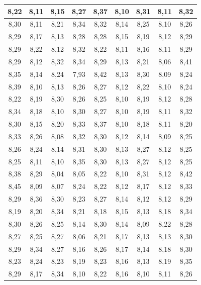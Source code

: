 \documentclass[a4paper,12pt]{article} %
\begin{document}
\begin{table}[]
	\begin{tabular}{|c|c|c|c|c|c|c|c|c|}
		\hline
		8,22 & 8,11 & 8,15 & 8,27 & 8,37 & 8,10 & 8,31 & 8,11 & 8,32 \\ \hline
		8,30 & 8,11 & 8,21 & 8,34 & 8,32 & 8,14 & 8,25 & 8,10 & 8,26 \\ \hline
		8,29 & 8,17 & 8,13 & 8,28 & 8,28 & 8,15 & 8,19 & 8,12 & 8,29 \\ \hline
		8,29 & 8,22 & 8,12 & 8,32 & 8,22 & 8,11 & 8,16 & 8,11 & 8,29 \\ \hline
		8,29 & 8,12 & 8,32 & 8,34 & 8,29 & 8,13 & 8,21 & 8,06 & 8,41 \\ \hline
		8,35 & 8,14 & 8,24 & 7,93 & 8,42 & 8,13 & 8,30 & 8,09 & 8,24 \\ \hline
		8,39 & 8,10 & 8,13 & 8,26 & 8,27 & 8,12 & 8,22 & 8,10 & 8,24 \\ \hline
		8,22 & 8,19 & 8,30 & 8,26 & 8,25 & 8,10 & 8,19 & 8,12 & 8,28 \\ \hline
		8,34 & 8,18 & 8,10 & 8,30 & 8,27 & 8,10 & 8,19 & 8,11 & 8,32 \\ \hline
		8,30 & 8,15 & 8,20 & 8,33 & 8,37 & 8,10 & 8,18 & 8,11 & 8,20 \\ \hline
		8,33 & 8,26 & 8,08 & 8,32 & 8,30 & 8,12 & 8,14 & 8,09 & 8,25 \\ \hline
		8,26 & 8,24 & 8,14 & 8,31 & 8,30 & 8,13 & 8,27 & 8,12 & 8,25 \\ \hline
		8,25 & 8,11 & 8,10 & 8,35 & 8,30 & 8,13 & 8,27 & 8,12 & 8,25 \\ \hline
		8,38 & 8,29 & 8,04 & 8,05 & 8,22 & 8,10 & 8,31 & 8,12 & 8,42 \\ \hline
		8,45 & 8,09 & 8,07 & 8,24 & 8,22 & 8,12 & 8,17 & 8,12 & 8,33 \\ \hline
		8,29 & 8,36 & 8,30 & 8,23 & 8,27 & 8,14 & 8,12 & 8,12 & 8,29 \\ \hline
		8,19 & 8,20 & 8,34 & 8,21 & 8,18 & 8,15 & 8,13 & 8,18 & 8,34 \\ \hline
		8,30 & 8,26 & 8,25 & 8,14 & 8,30 & 8,14 & 8,09 & 8,22 & 8,28 \\ \hline
		8,27 & 8,25 & 8,27 & 8,06 & 8,21 & 8,17 & 8,13 & 8,13 & 8,30 \\ \hline
		8,29 & 8,34 & 8,27 & 8,16 & 8,26 & 8,17 & 8,14 & 8,18 & 8,30 \\ \hline
		8,23 & 8,24 & 8,23 & 8,19 & 8,23 & 8,16 & 8,13 & 8,19 & 8,35 \\ \hline
		8,29 & 8,17 & 8,34 & 8,10 & 8,22 & 8,16 & 8,10 & 8,11 & 8,26 \\ \hline

\end{tabular}
\end{table}
\end{document}

